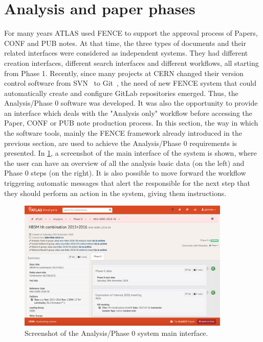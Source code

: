 

\section{Analysis and paper phases}
\label{sec:Analysis_and_paper_phases}

For many years ATLAS used FENCE to support the approval process of Papers, CONF and PUB notes.
At that time, the three types of documents and their related interfaces were considered as independent systems.
They had different creation interfaces, different search interfaces and different workflows, all starting from Phase 1.
Recently, since many projects at CERN changed their version control software from SVN~\cite{svn} to Git~\cite{gitlab}, the need of new FENCE system that could automatically create and configure GitLab repositories emerged.
Thus, the Analysis/Phase 0 software was developed. It was also the opportunity to provide an interface which deals with the "Analysis only" workflow before accessing the Paper, CONF or PUB note production process.
In this section, the way in which the software tools, mainly the FENCE framework already introduced in the previous section, are used to achieve the Analysis/Phase 0 requirements is presented.
In \cref{fig:Glance_Papers_Phase0}, a screenshot of the main interface of the system is shown, where the user can have an overview of all the analysis basic data (on the left) and Phase 0 steps (on the right).
It is also possible to move forward the workflow triggering automatic messages that alert the responsible for the next step that they should perform an action in the system, giving them instructions.

\begin{figure}[htb]
  \centering
  \includegraphics[width=0.9\textwidth]{figures/Glance_Papers_Phase0.png}
  \caption{Screenshot of the Analysis/Phase 0 system main interface.}
  \label{fig:Glance_Papers_Phase0}
\end{figure}

